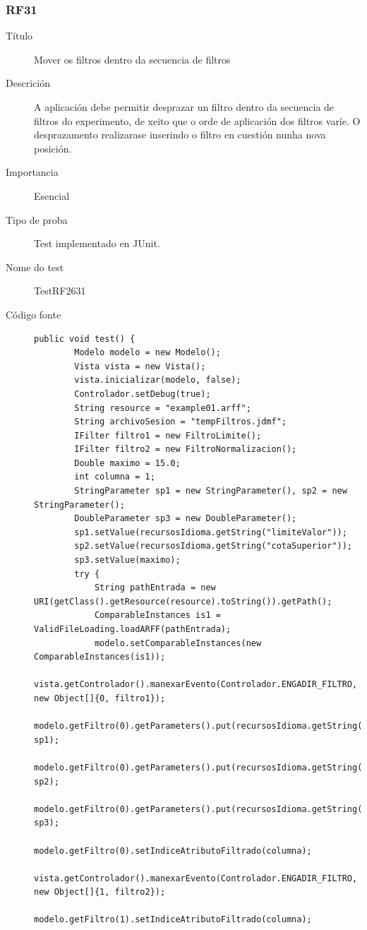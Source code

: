 \subsubsection*{RF31}
\begin{description}
\item[Título] \hfill
Mover os filtros dentro da secuencia de filtros
\item[Descrición] \hfill
A aplicación debe permitir desprazar un filtro dentro da secuencia de filtros do experimento, de xeito que o orde de aplicación dos filtros varíe. O desprazamento realizarase inserindo o filtro en cuestión nunha nova posición.
\item[Importancia] \hfill
Esencial
\item[Tipo de proba] \hfill
Test implementado en JUnit.
\item[Nome do test] \hfill
TestRF2631
\item[Código fonte]
\begin{lstlisting}
public void test() {
        Modelo modelo = new Modelo();
        Vista vista = new Vista();
        vista.inicializar(modelo, false);
        Controlador.setDebug(true);
        String resource = "example01.arff";
        String archivoSesion = "tempFiltros.jdmf";
        IFilter filtro1 = new FiltroLimite();
        IFilter filtro2 = new FiltroNormalizacion();
        Double maximo = 15.0;
        int columna = 1;
        StringParameter sp1 = new StringParameter(), sp2 = new StringParameter();
        DoubleParameter sp3 = new DoubleParameter();
        sp1.setValue(recursosIdioma.getString("limiteValor"));
        sp2.setValue(recursosIdioma.getString("cotaSuperior"));
        sp3.setValue(maximo);
        try {
            String pathEntrada = new URI(getClass().getResource(resource).toString()).getPath();
            ComparableInstances is1 = ValidFileLoading.loadARFF(pathEntrada);
            modelo.setComparableInstances(new ComparableInstances(is1));
            vista.getControlador().manexarEvento(Controlador.ENGADIR_FILTRO, new Object[]{0, filtro1});
            modelo.getFiltro(0).getParameters().put(recursosIdioma.getString("tipoLimite"), sp1);
            modelo.getFiltro(0).getParameters().put(recursosIdioma.getString("tipoCota"), sp2);
            modelo.getFiltro(0).getParameters().put(recursosIdioma.getString("valor"), sp3);
            modelo.getFiltro(0).setIndiceAtributoFiltrado(columna);
            vista.getControlador().manexarEvento(Controlador.ENGADIR_FILTRO, new Object[]{1, filtro2});
            modelo.getFiltro(1).setIndiceAtributoFiltrado(columna);

\end{lstlisting}
\end{description}

